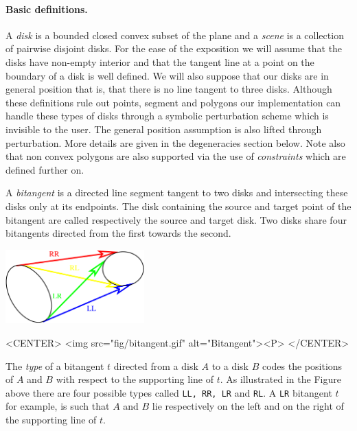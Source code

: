\paragraph{Basic definitions.}
A \emph{disk} is a bounded closed convex subset of the plane and a
\emph{scene} is a collection of pairwise disjoint disks. For the ease of
the exposition we will assume that the disks have non-empty interior and
that the tangent line at a point on the boundary of a disk is well
defined. We will also suppose that our disks are in general position that
is, that there is no line tangent to three disks. Although these
definitions rule out points, segment and polygons our implementation can
handle these types of disks through a symbolic perturbation scheme which is
invisible to the user.  The general position assumption is also lifted
through perturbation.  More details are given in the degeneracies section
below. Note also that non convex polygons are also supported via the use of
\emph{constraints} which are defined further on.

A \emph{bitangent} is a directed line segment tangent to two disks and
intersecting these disks only at its endpoints.  The disk containing the
source and target point of the bitangent are called respectively the source
and target disk.  Two disks share four bitangents directed from the first
towards the second.

\begin{ccTexOnly}
    \begin{center}
      \parbox{0.4\textwidth}{%
          \includegraphics[width=0.4\textwidth]{Visibility_complex_2/fig/bitangent}%
      }
    \end{center}
\end{ccTexOnly}

\begin{ccHtmlOnly}
    <CENTER>
        <img src="fig/bitangent.gif" alt="Bitangent"><P>
    </CENTER>
\end{ccHtmlOnly}

\label{VC2-bit-type}
The \emph{type} of a bitangent $t$ directed from a disk $A$ to a disk $B$
codes the positions of $A$ and $B$ with respect to the supporting line of
$t$. As illustrated in the Figure above there are four possible types
called \texttt{LL, RR, LR} and \texttt{RL}. A \texttt{LR} bitangent $t$ for
example, is such that $A$ and $B$ lie respectively on the left and on the
right of the supporting line of $t$.

